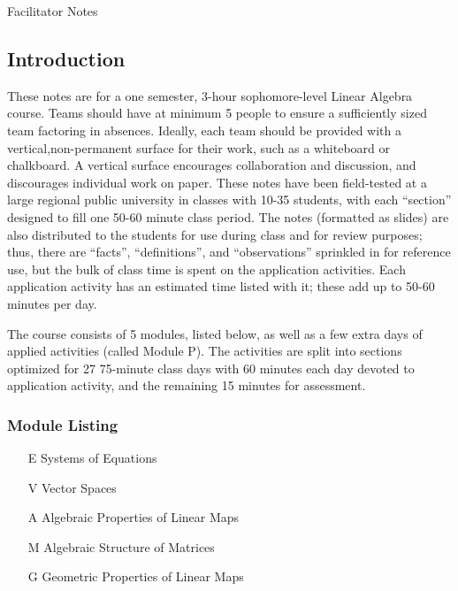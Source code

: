 \documentclass{article}
\begin{document}
\begin{center}
{\Large Facilitator Notes}
\end{center}

\subsection*{Introduction}

These notes are for a one semester, 3-hour sophomore-level Linear Algebra course.  Teams should have at minimum 5 people to ensure a sufficiently sized team factoring in absences.  Ideally, each team should be provided with a vertical,non-permanent surface for their work, such as a whiteboard or chalkboard.  A vertical surface encourages collaboration and discussion, and discourages individual work on paper.  These notes have been field-tested at a large regional public university in classes with 10-35 students, with each ``section'' designed to fill one 50-60 minute class period.  The notes (formatted as slides) are also distributed to the students for use during class and for review purposes; thus, there are ``facts'', ``definitions'', and ``observations'' sprinkled in for reference use, but the bulk of class time is spent on the application activities.  Each application activity has an estimated time listed with it; these add up to 50-60 minutes per day.

The course consists of 5 modules, listed below, as well as a few extra days of applied activities (called Module P). The activities are split into sections optimized for 27 75-minute class days with 60 minutes each day devoted to application activity, and the remaining 15 minutes for assessment.  

\subsubsection*{Module Listing}
\begin{enumerate}
\item [E] Systems of Equations
\item [V] Vector Spaces
\item [A] Algebraic Properties of Linear Maps
\item [M] Algebraic Structure of Matrices
\item [G] Geometric Properties of Linear Maps
\end{enumerate}
\end{document}
